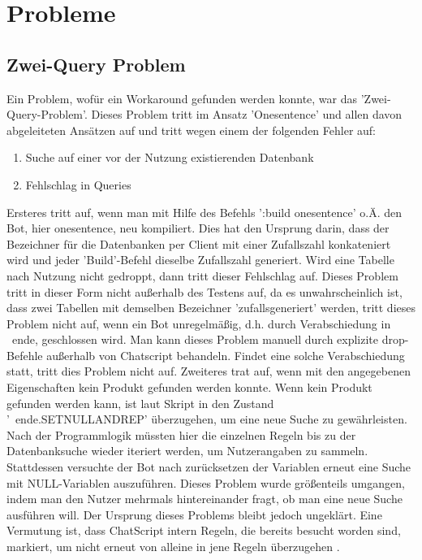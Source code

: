 \chapter{Probleme}
\label{sec:Probleme}


\section{Zwei-Query Problem}
\label{Section: Zwei-Query Problem}

Ein Problem, wofür ein Workaround gefunden werden konnte, war das 'Zwei-Query-Problem'. Dieses Problem tritt im Ansatz 'Onesentence' und allen davon abgeleiteten Ansätzen auf und tritt wegen einem der folgenden Fehler auf:

\begin{enumerate}
\item {Suche auf einer vor der Nutzung existierenden Datenbank}
\item {Fehlschlag in Queries}
\end{enumerate}  

Ersteres tritt auf, wenn man mit Hilfe des Befehls ':build onesentence' o.Ä. den Bot, hier onesentence, neu kompiliert. Dies hat den Ursprung darin, dass der Bezeichner für die Datenbanken per Client mit einer Zufallszahl konkateniert wird und jeder 'Build'-Befehl dieselbe Zufallszahl generiert. Wird eine Tabelle nach Nutzung nicht gedroppt, dann tritt dieser Fehlschlag auf. Dieses Problem tritt in dieser Form nicht außerhalb des Testens auf, da es unwahrscheinlich ist, dass zwei Tabellen mit demselben Bezeichner 'zufallsgeneriert' werden, tritt dieses Problem nicht auf, wenn ein Bot unregelmäßig, d.h. durch Verabschiedung in ~ende, geschlossen wird. Man kann dieses Problem manuell durch explizite drop-Befehle außerhalb von Chatscript behandeln. Findet eine solche Verabschiedung statt, tritt dies Problem nicht auf. 
Zweiteres trat auf, wenn mit den angegebenen Eigenschaften kein Produkt gefunden werden konnte. Wenn kein Produkt gefunden werden kann, ist laut Skript in den Zustand '~ende.SETNULLANDREP' überzugehen, um eine neue Suche zu gewährleisten. Nach der Programmlogik müssten hier die einzelnen Regeln bis zu der Datenbanksuche wieder iteriert werden, um Nutzerangaben zu sammeln. Stattdessen versuchte der Bot nach zurücksetzen der Variablen erneut eine Suche mit NULL-Variablen auszuführen. Dieses Problem wurde größenteils umgangen, indem man den Nutzer mehrmals hintereinander fragt, ob man eine neue Suche ausführen will. Der Ursprung dieses Problems bleibt jedoch ungeklärt. Eine Vermutung ist, dass ChatScript intern Regeln, die bereits besucht worden sind, markiert, um nicht erneut von alleine in jene Regeln überzugehen \cite{chatscript2019}.

